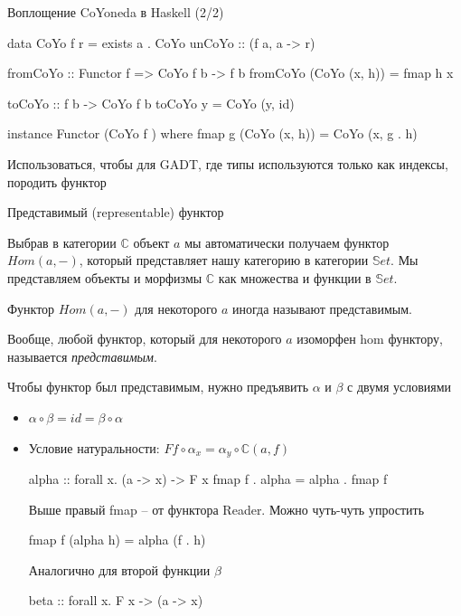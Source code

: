\documentclass[
  russian,
  aspectratio=169,
  xcolor={svgnames},
  hyperref={colorlinks,citecolor=DeepPink4}]{beamer}
\begin{document}
\begin{frame}[fragile]{Воплощение CoYoneda в Haskell (2/2)}
\begin{hslisting}
data CoYo f r = exists a . CoYo { unCoYo :: (f a, a -> r) }
\end{hslisting}

\begin{hslisting}
fromCoYo :: Functor f => CoYo f b -> f b
fromCoYo (CoYo (x, h)) = fmap h x

toCoYo :: f b -> CoYo f b
toCoYo y = CoYo (y, id)

instance Functor (CoYo f ) where
  fmap g (CoYo (x, h)) = CoYo (x, g . h)
\end{hslisting}
Использоваться, чтобы для GADT, где типы используются только как индексы, породить функтор
\end{frame}


\begin{frame}[fragile]{Представимый (representable) функтор}

Выбрав в категории $\mathbb{C}$ объект $a$ мы автоматически получаем функтор $Hom(a,-)$, который представляет нашу категорию в категории $\mathbb{S}et$. Мы представляем объекты и морфизмы $\mathbb{C}$ как множества и функции в $\mathbb{S}et$.\vspace{0.5cm}

Функтор $Hom(a,-)$ для некоторого $a$ иногда называют представимым.\vspace{0.5cm}

Вообще, любой функтор, который для некоторого $a$ изоморфен
hom функтору, называется \emph{представимым}.\vspace{0.5cm}
\end{frame}

\begin{frame}[fragile]
Чтобы функтор был представимым, нужно предъявить $\alpha$ и $\beta$ с двумя условиями

\begin{itemize}
 \item $\alpha\circ\beta = \mathit{id} = \beta\circ\alpha$
 \item Условие натуральности:
     $Ff \circ \alpha_x = \alpha_y \circ \mathbb{C}(a, f)$
 \begin{hslisting}
  alpha :: forall x. (a -> x) -> F x
  fmap f . alpha = alpha . fmap f
 \end{hslisting}
 Выше правый fmap -- от функтора Reader. Можно чуть-чуть упростить
 \begin{hslisting}
  fmap f (alpha h) = alpha (f . h)
 \end{hslisting}\vspace{0.5cm}
Аналогично для второй функции $\beta$
 \begin{hslisting}
  beta :: forall x. F x -> (a -> x)
 \end{hslisting}
\end{itemize}
\end{frame}
\end{document}

